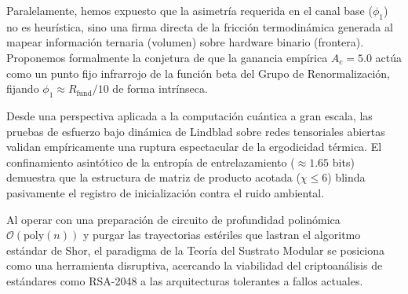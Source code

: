 \documentclass[12pt,a4paper]{article}
\theoremstyle{plain}
\theoremstyle{definition}
\theoremstyle{remark}
\begin{document}
Paralelamente, hemos expuesto que la asimetría requerida en el canal base ($\phi_1$) no es heurística, sino una firma directa de la fricción termodinámica generada al mapear información ternaria (volumen) sobre hardware binario (frontera). Proponemos formalmente la conjetura de que la ganancia empírica $A_c=5.0$ actúa como un punto fijo infrarrojo de la función beta del Grupo de Renormalización, fijando $\phi_1 \approx R_{\text{fund}}/10$ de forma intrínseca.

Desde una perspectiva aplicada a la computación cuántica a gran escala, las pruebas de esfuerzo bajo dinámica de Lindblad sobre redes tensoriales abiertas validan empíricamente una ruptura espectacular de la ergodicidad térmica. El confinamiento asintótico de la entropía de entrelazamiento ($\approx 1.65$ bits) demuestra que la estructura de matriz de producto acotada ($\chi \le 6$) blinda pasivamente el registro de inicialización contra el ruido ambiental.

Al operar con una preparación de circuito de profundidad polinómica $\mathcal{O}(\text{poly}(n))$ y purgar las trayectorias estériles que lastran el algoritmo estándar de Shor, el paradigma de la Teoría del Sustrato Modular se posiciona como una herramienta disruptiva, acercando la viabilidad del criptoanálisis de estándares como RSA-2048 a las arquitecturas tolerantes a fallos actuales.
\end{document}
